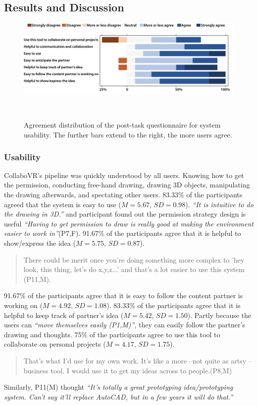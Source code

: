 \documentclass{sigchi}
\begin{document}
\subsection{Results and Discussion} 
\begin{figure}[tb!]
 \centering
 \includegraphics[width=0.98\columnwidth]{usability.png}
 \caption{Agreement distribution of the post-task questionnaire for system usability. The further bars extend to the right, the more users agree.
 }~\label{fig:usability}
\end{figure}
\subsubsection{Usability}
CollaboVR's pipeline was quickly understood by all users. Knowing how to get the permission, conducting free-hand drawing, drawing 3D objects, manipulating the drawing afterwards, and spectating other users. 83.33\% of the participants agreed that the system is easy to use ($M=5.67$, $SD=0.98$). \textit{``It is intuitive to do the drawing in 3D.''} and participant found out the permission strategy design is useful \textit{``Having to get permission to draw is really good at making the environment easier to work in''}(P7,F).
91.67\% of the participants agree that it is helpful to show/express the idea ($M=5.75$, $SD=0.87$). 
\begin{quote}
    There could be merit once you're doing something more complex to 'hey look, this thing, let's do x,y,z...' and that's a lot easier to use this system (P11,M).    
\end{quote}
91.67\% of the participants agree that it is easy to follow the content partner is working on ($M=4.92$, $SD=1.08$).
83.33\% of the participants agree that it is helpful to keep track of partner's idea ($M=5.42$, $SD=1.50$). Partly because the users can \textit{``move themselves easily (P1,M)''}, they can easily follow the partner's drawing and thoughts.
75\% of the participants agree to use this tool to collaborate on personal projects ($M=4.17$, $SD=1.75$). 
\begin{quote}
    That's what I'd use for my own work. It's like a more --not quite as artsy -- business tool. I would use it to get my ideas across to people.(P8,M)
\end{quote}
Similarly, P11(M) thought \textit{``It's totally a great prototyping idea/prototyping system. Can't say it'll replace AutoCAD, but in a few years it will do that.''}
\end{document}
